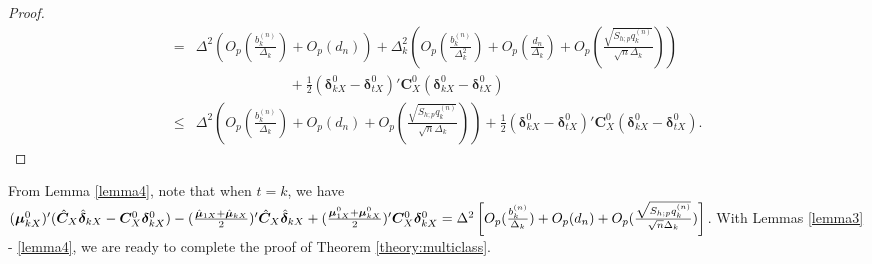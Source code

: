 \documentclass[12pt]{article}
\begin{document}
\begin{proof}{}{}
\begin{align*}
= & \Delta^2 (O_p(\frac{b_k^{(n)}}{\Delta_k}) + O_p(d_n)) + \Delta_k^2 ( O_p(\frac{b_k^{(n)}}{\Delta_k^2}) + O_p(\frac{d_n}{\Delta_k}) + O_p(\frac{\sqrt{S_{h;p} q_k^{(n)}}}{\sqrt{n} \Delta_k}) ) \\
&~~~~~~~~~~~~~~~~~~~~~~~~~~~~~~ + \frac{1}{2} (\bm \delta_{kX}^0 - \bm \delta_{tX}^0)' \bm C_X^0 (\bm \delta_{kX}^0 - \bm \delta_{tX}^0)   \\
\leq & \Delta^2 \left( O_p(\frac{b_k^{(n)}}{\Delta_k}) + O_p(d_n) + O_p(\frac{\sqrt{S_{h;p} q_k^{(n)}}}{\sqrt{n} \Delta_k}) \right) + \frac{1}{2} (\bm \delta_{kX}^0 - \bm \delta_{tX}^0)' \bm C_X^0 (\bm \delta_{kX}^0 - \bm \delta_{tX}^0).
\end{align*}
\end{proof}
From Lemma \ref{lemma4}, note that when $t = k$, we have $(\bm \mu_{kX}^0)' (\hat{\bm C}_X \hat{\bm \delta}_{kX} - \bm C_X^0 \bm \delta_{kX}^0) - (\frac{\hat{\bm \mu}_{1X} + \hat{\bm \mu}_{kX}}{2})' \hat{\bm C}_X \hat{\bm \delta}_{kX}\\ + (\frac{\bm \mu_{1X}^0 + \bm \mu_{kX}^0}{2})' \bm C_X^0 \bm \delta_{kX}^0 = \Delta^2 \left[ O_p(\frac{b_k^{(n)}}{\Delta_k}) + O_p(d_n) + O_p(\frac{\sqrt{S_{h;p} q_k^{(n)}}}{\sqrt{n} \Delta_k}) \right]$.
With Lemmas \ref{lemma3} - \ref{lemma4}, we are ready to complete the proof of Theorem \ref{theory:multiclass}.
\end{document}
